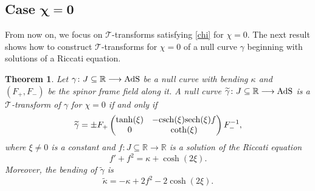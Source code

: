 \documentclass[10pt,a4paper]{amsart}
\numberwithin{equation}{section}
\newtheorem{Theorem}{Theorem}[section]
\def\bending{\kappa}
\def\R{\mathbb{R}}
\def\AdS{{\rm AdS}}
\def\sech{{\rm sech}}
\def\csch{{\rm csch}}
\begin{document}
\subsection[Case chi = 0]{Case $\boldsymbol{\chi=0}$}

From now on, we focus on $\mathcal{T}$-transforms satisfying \eqref{chi} for $\chi=0$. The next result shows how to construct $\mathcal{T}$-transforms for $\chi=0$ of a null curve $\gamma$ beginning with solutions of a Riccati equation.


\begin{Theorem}\label{T2} Let $\gamma\colon J\subseteq\R\longrightarrow\AdS$ be a null curve with bending $\bending$ and $(F_+,F_-)$ be the spinor frame field along it. A null curve $\widetilde{\gamma}\colon J\subseteq\R\longrightarrow \AdS$ is a $\mathcal{T}$-transform of $\gamma$ for $\chi=0$ if and only if
	\begin{equation}\label{gammatilda}
		\widetilde{\gamma}=\pm F_+\begin{pmatrix} \tanh(\xi) & -\csch(\xi)\sech(\xi)f \\ 0 & \coth(\xi) \end{pmatrix} F_-^{-1},
	\end{equation}
	where $\xi\neq 0$ is a constant and $f\colon J\subseteq\R\longrightarrow\R$ is a solution of the Riccati equation
	\begin{equation}\label{Riccati}
		f'+f^2=\bending+\cosh(2\xi).
	\end{equation}
	Moreover, the bending of $\widetilde{\gamma}$ is
	\begin{equation}\label{T2:f3}
		\widetilde{\bending}=-\bending+2f^2-2\cosh(2\xi).
	\end{equation}
\end{Theorem}
\end{document}
